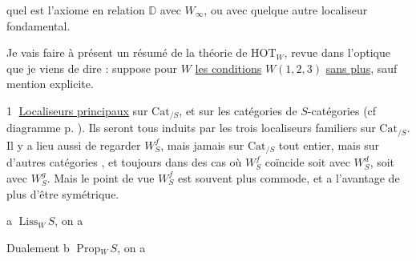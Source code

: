 quel est l'axiome  en relation  
$\mathbb{D}$ avec $W_\infty$, ou avec quelque autre localiseur
fondamental.

Je vais faire à présent un résumé de la
théorie de $\mathrm{HOT}_W$, revue dans l'optique que je
viens de dire :  suppose pour $W$ \uline{les conditions}
$W(1,2,3)$ \uline{sans plus}, sauf mention explicite.

\textcircled{1} \uline{Localiseurs principaux} sur $\mathrm{Cat}_{/S}$, et sur les
 catégories  de $S$-catégories (cf diagramme p. ). Ils seront tous induits par les trois
localiseurs familiers
sur $\mathrm{Cat}_{/S}$.  Il y a lieu aussi de
regarder $W_S^f$, mais jamais sur $\mathrm{Cat}_{/S}$ tout entier,
mais sur d'autres catégories , et
toujours dans des cas où $W_S^f$ coïncide soit avec
$W_S^d$, soit avec $W_S^g$. Mais le point de vue $W_S^f$ est
souvent plus  commode, et a l'avantage de
plus d'être symétrique.

\textcircled{a}  \uline{$\mathrm{Liss}$}$_W\,S$, on a

Dualement  \textcircled{b}  \uline{$\mathrm{Prop}$}$_W\,S$, on a
